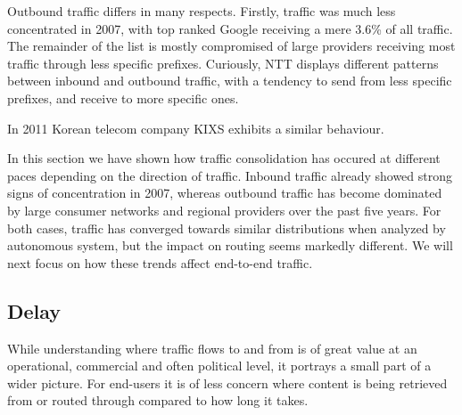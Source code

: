     Outbound traffic differs in many respects. Firstly, traffic was much less concentrated in 2007, with top ranked Google receiving a mere 3.6\% of all traffic. The remainder of the list is mostly compromised of large providers receiving most traffic through less specific prefixes. Curiously, NTT displays different patterns between inbound and outbound traffic, with a tendency to send from less specific prefixes, and receive to more specific ones. 

    In 2011 Korean telecom company KIXS exhibits a similar behaviour.  %

    In this section we have shown how traffic consolidation has occured at different paces depending on the direction of traffic. Inbound traffic already showed strong signs of concentration in 2007, whereas outbound traffic has become dominated by large consumer networks and regional providers over the past five years. For both cases, traffic has converged towards similar distributions when analyzed by autonomous system, but the impact on routing seems markedly different. We will next focus on how these trends affect end-to-end traffic.


\subsection{Delay}
 
While understanding where traffic flows to and from is of great value at an operational, commercial and often political level, it portrays a small part of a wider picture. 
For end-users it is of less concern where content is being retrieved from or routed through compared to how long it takes.

